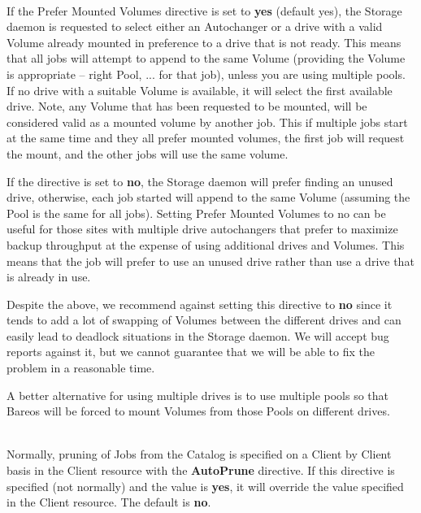 \begin{description}
\label{PreferMountedVolumes}
\item [Prefer Mounted Volumes = {\textless}yes{\textbar}no{\textgreater}] \hfill \\
If the Prefer Mounted Volumes directive is set to {\bf yes} (default
yes), the Storage daemon is requested to select either an Autochanger or
a drive with a valid Volume already mounted in preference to a drive
that is not ready.  This means that all jobs will attempt to append
to the same Volume (providing the Volume is appropriate -- right Pool,
... for that job), unless you are using multiple pools.
If no drive with a suitable Volume is available, it
will select the first available drive.  Note, any Volume that has
been requested to be mounted, will be considered valid as a mounted
volume by another job.  This if multiple jobs start at the same time
and they all prefer mounted volumes, the first job will request the
mount, and the other jobs will use the same volume.

If the directive is set to {\bf no}, the Storage daemon will prefer
finding an unused drive, otherwise, each job started will append to the
same Volume (assuming the Pool is the same for all jobs).  Setting
Prefer Mounted Volumes to no can be useful for those sites
with multiple drive autochangers that prefer to maximize backup
throughput at the expense of using additional drives and Volumes.
This means that the job will prefer to use an unused drive rather
than use a drive that is already in use.

Despite the above, we recommend against setting this directive to
{\bf no} since
it tends to add a lot of swapping of Volumes between the different
drives and can easily lead to deadlock situations in the Storage
daemon. We will accept bug reports against it, but we cannot guarantee
that we will be able to fix the problem in a reasonable time.

A better alternative for using multiple drives is to use multiple
pools so that Bareos will be forced to mount Volumes from those Pools
on different drives.

\item [Prune Jobs = {\textless}yes{\textbar}no{\textgreater}] \hfill \\
Normally, pruning of Jobs from the Catalog is specified on a Client by
Client basis in the Client resource with the {\bf AutoPrune} directive.
If this directive is specified (not normally) and the value is {\bf
yes}, it will override the value specified in the Client resource.  The
default is {\bf no}.



\end{description}
